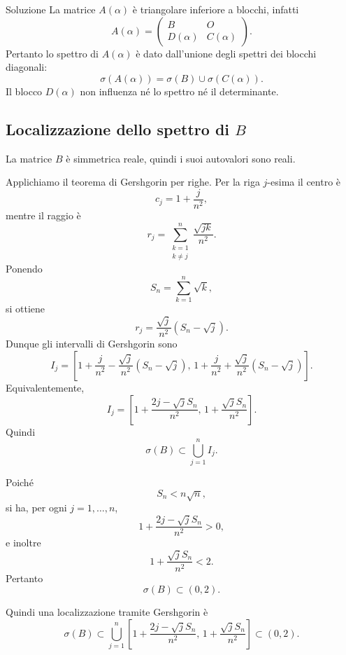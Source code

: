 \documentclass[a4paper]{article}
\begin{document}
\begin{snippetsolution}{Soluzione}
    La matrice \(A(\alpha)\) è triangolare inferiore a blocchi, infatti
    \[
        A(\alpha)=
        \begin{pmatrix}
            B & O\\
            D(\alpha) & C(\alpha)
        \end{pmatrix}.
    \]
    Pertanto lo spettro di \(A(\alpha)\) è dato dall'unione degli spettri dei blocchi diagonali:
    \[
        \sigma(A(\alpha))=\sigma(B)\cup\sigma(C(\alpha)).
    \]
    Il blocco \(D(\alpha)\) non influenza né lo spettro né il determinante.

    \subsection*{Localizzazione dello spettro di \(B\)}

    La matrice \(B\) è simmetrica reale, quindi i suoi autovalori sono reali.

    Applichiamo il teorema di Gershgorin per righe. Per la riga \(j\)-esima il centro è
    \[
        c_j=1+\frac{j}{n^2},
    \]
    mentre il raggio è
    \[
        r_j
        =
        \sum_{\substack{k=1\\ k\neq j}}^n
        \frac{\sqrt{jk}}{n^2}.
    \]
    Ponendo
    \[
        S_n=\sum_{k=1}^n \sqrt{k},
    \]
    si ottiene
    \[
        r_j
        =
        \frac{\sqrt{j}}{n^2}\left(S_n-\sqrt{j}\right).
    \]
    Dunque gli intervalli di Gershgorin sono
    \[
        I_j=
        \left[
            1+\frac{j}{n^2}
            -
            \frac{\sqrt{j}}{n^2}\left(S_n-\sqrt{j}\right),
            \,
            1+\frac{j}{n^2}
            +
            \frac{\sqrt{j}}{n^2}\left(S_n-\sqrt{j}\right)
        \right].
    \]
    Equivalentemente,
    \[
        I_j=
        \left[
            1+\frac{2j-\sqrt{j}S_n}{n^2},
            \,
            1+\frac{\sqrt{j}S_n}{n^2}
        \right].
    \]
    Quindi
    \[
        \sigma(B)\subset \bigcup_{j=1}^n I_j.
    \]

    Poiché
    \[
        S_n< n\sqrt{n},
    \]
    si ha, per ogni \(j=1,\dots,n\),
    \[
        1+\frac{2j-\sqrt{j}S_n}{n^2}>0,
    \]
    e inoltre
    \[
        1+\frac{\sqrt{j}S_n}{n^2}<2.
    \]
    Pertanto
    \[
        \sigma(B)\subset (0,2).
    \]

    Quindi una localizzazione tramite Gershgorin è
    \[
        \boxed{
            \sigma(B)\subset \bigcup_{j=1}^n
            \left[
                1+\frac{2j-\sqrt{j}S_n}{n^2},
                \,
                1+\frac{\sqrt{j}S_n}{n^2}
            \right]
            \subset (0,2).
        }
    \]


\end{snippetsolution}
\end{document}
